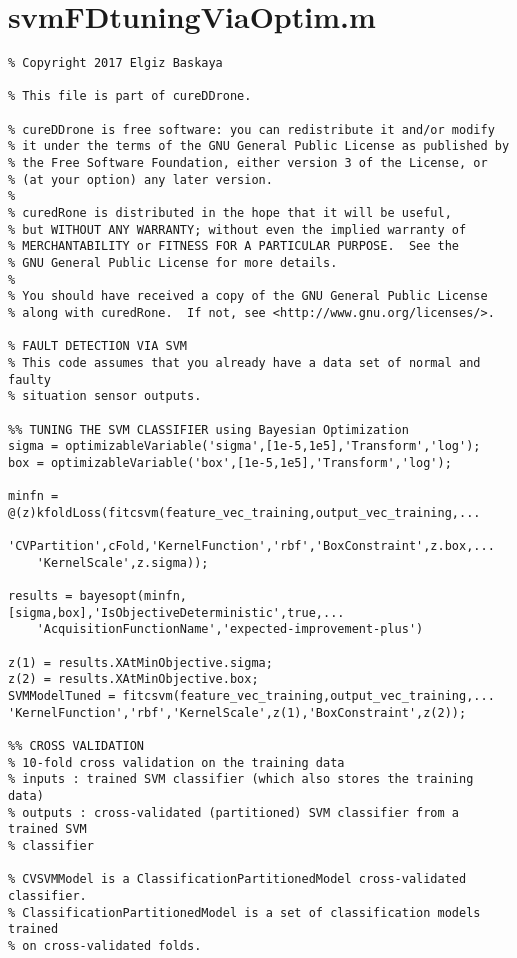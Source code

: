  
  \section{svmFDtuningViaOptim.m}
\begin{lstlisting}
% Copyright 2017 Elgiz Baskaya

% This file is part of cureDDrone.

% cureDDrone is free software: you can redistribute it and/or modify
% it under the terms of the GNU General Public License as published by
% the Free Software Foundation, either version 3 of the License, or
% (at your option) any later version.
% 
% curedRone is distributed in the hope that it will be useful,
% but WITHOUT ANY WARRANTY; without even the implied warranty of
% MERCHANTABILITY or FITNESS FOR A PARTICULAR PURPOSE.  See the
% GNU General Public License for more details.
% 
% You should have received a copy of the GNU General Public License
% along with curedRone.  If not, see <http://www.gnu.org/licenses/>.

% FAULT DETECTION VIA SVM
% This code assumes that you already have a data set of normal and faulty 
% situation sensor outputs.

%% TUNING THE SVM CLASSIFIER using Bayesian Optimization
sigma = optimizableVariable('sigma',[1e-5,1e5],'Transform','log');
box = optimizableVariable('box',[1e-5,1e5],'Transform','log');

minfn = @(z)kfoldLoss(fitcsvm(feature_vec_training,output_vec_training,...
    'CVPartition',cFold,'KernelFunction','rbf','BoxConstraint',z.box,...
    'KernelScale',z.sigma));

results = bayesopt(minfn,[sigma,box],'IsObjectiveDeterministic',true,...
    'AcquisitionFunctionName','expected-improvement-plus')

z(1) = results.XAtMinObjective.sigma;
z(2) = results.XAtMinObjective.box;
SVMModelTuned = fitcsvm(feature_vec_training,output_vec_training,...
'KernelFunction','rbf','KernelScale',z(1),'BoxConstraint',z(2));

%% CROSS VALIDATION
% 10-fold cross validation on the training data
% inputs : trained SVM classifier (which also stores the training data)
% outputs : cross-validated (partitioned) SVM classifier from a trained SVM
% classifier

% CVSVMModel is a ClassificationPartitionedModel cross-validated classifier.
% ClassificationPartitionedModel is a set of classification models trained 
% on cross-validated folds.


\end{lstlisting}
